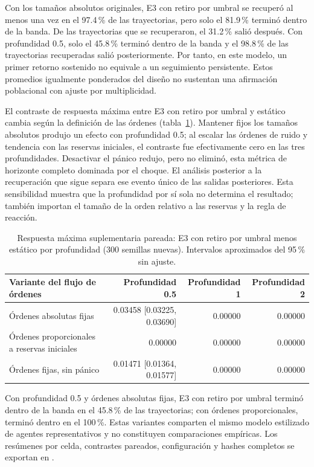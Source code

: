 Con los tamaños absolutos originales, E3 con retiro por umbral se recuperó al menos una vez en el 97.4\,\% de las trayectorias, pero solo el 81.9\,\% terminó dentro de la banda. De las trayectorias que se recuperaron, el 31.2\,\% salió después. Con profundidad 0.5, solo el 45.8\,\% terminó dentro de la banda y el 98.8\,\% de las trayectorias recuperadas salió posteriormente. Por tanto, en este modelo, un primer retorno sostenido no equivale a un seguimiento persistente. Estos promedios igualmente ponderados del diseño no sustentan una afirmación poblacional con ajuste por multiplicidad.

El contraste de respuesta máxima entre E3 con retiro por umbral y estático cambia según la definición de las órdenes (tabla~\ref{tab:engineering-sensitivity}). Mantener fijos los tamaños absolutos produjo un efecto con profundidad 0.5; al escalar las órdenes de ruido y tendencia con las reservas iniciales, el contraste fue efectivamente cero en las tres profundidades. Desactivar el pánico redujo, pero no eliminó, esta métrica de horizonte completo dominada por el choque. El análisis posterior a la recuperación que sigue separa ese evento único de las salidas posteriores. Esta sensibilidad muestra que la profundidad por sí sola no determina el resultado; también importan el tamaño de la orden relativo a las reservas y la regla de reacción.

\begin{table}[htbp]
\centering
\caption{Respuesta máxima suplementaria pareada: E3 con retiro por umbral menos estático por profundidad (300 semillas nuevas). Intervalos aproximados del 95\,\% sin ajuste.}
\label{tab:engineering-sensitivity}
\small
\begin{tabular}{@{}lrrr@{}}
\toprule
Variante del flujo de órdenes & Profundidad 0.5 & Profundidad 1 & Profundidad 2 \\
\midrule
Órdenes absolutas fijas & 0.03458 [0.03225, 0.03690] & 0.00000 & 0.00000 \\
Órdenes proporcionales a reservas iniciales & 0.00000 & 0.00000 & 0.00000 \\
Órdenes fijas, sin pánico & 0.01471 [0.01364, 0.01577] & 0.00000 & 0.00000 \\
\bottomrule
\end{tabular}
\end{table}

Con profundidad 0.5 y órdenes absolutas fijas, E3 con retiro por umbral terminó dentro de la banda en el 45.8\,\% de las trayectorias; con órdenes proporcionales, terminó dentro en el 100\,\%. Estas variantes comparten el mismo modelo estilizado de agentes representativos y no constituyen comparaciones empíricas. Los resúmenes por celda, contrastes pareados, configuración y hashes completos se exportan en .


